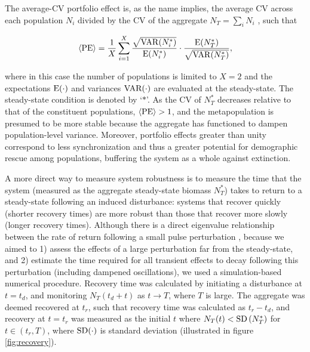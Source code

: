 \documentclass{revtex4}
\begin{document}
The average-CV portfolio effect is, as the name implies, the average CV across each population $N_i$ divided by the CV of the aggregate $N_T=\sum_i N_i$ \citep{Anderson:2013gb}, such that


\begin{equation}
\langle{\rm PE}\rangle =\frac{1}{X}\sum_{i=1}^{X} \frac{\sqrt{{\rm VAR}(N_i^*)}}{{\rm E}(N_i^*)}\cdot \frac{{\rm E}(N_T^*)}{\sqrt{{\rm VAR}(N_T^*)}},
\label{eq:pe}
\end{equation}

\noindent where in this case the number of populations is limited to $X=2$ and the expectations $\rm E(\cdot)$ and variances $\rm VAR(\cdot)$ are evaluated at the steady-state.
The steady-state condition is denoted by `$*$'.
As the CV of $N_T^*$ decreases relative to that of the constituent populations, $\langle{\rm PE}\rangle > 1$, and the metapopulation is presumed to be more stable because the aggregate has functioned to dampen population-level variance.
Moreover, portfolio effects greater than unity correspond to less synchronization  \citep{Loreau:2008ju,Anderson:2014cx,Yeakel:2013vz} and thus a greater potential for demographic rescue among populations, buffering the system as a whole against extinction. 

A more direct way to measure system robustness is to measure the time that the system (measured as the aggregate steady-state biomass $N_T^*$) takes to return to a steady-state following an induced disturbance: systems that recover quickly (shorter recovery times) are more robust than those that recover more slowly (longer recovery times).
Although there is a direct eigenvalue relationship between the rate of return following a small pulse perturbation \citep{GuckHolmes}, because we aimed to 
1) assess the effects of a large perturbation far from the steady-state, and 
2) estimate the time required for all transient effects to decay following this perturbation (including dampened oscillations), we used a simulation-based numerical procedure.
Recovery time was calculated by initiating a disturbance at $t=t_d$, and monitoring $N_T(t_d+t)$ as $t\rightarrow T$, where $T$ is large. 
The aggregate was deemed recovered at $t_r$, such that recovery time was calculated as $t_r-t_d$, and recovery at $t=t_r$ was measured as the initial $t$ where $N_T(t) < {\rm SD}\left( N_T^* \right)$ for $t\in(t_r,T)$, where $\rm{SD}(\cdot)$ is standard deviation (illustrated in figure \ref{fig:recovery}).
\end{document}
